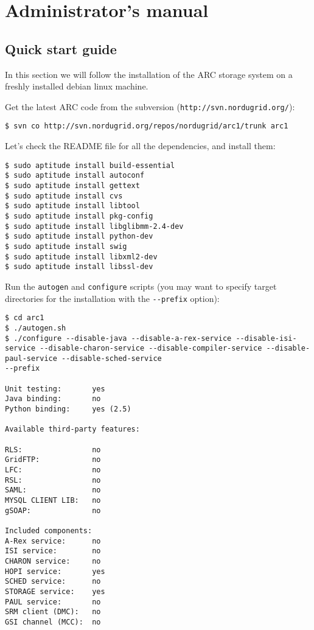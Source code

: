 \documentclass{book}
\begin{document}
\chapter{Administrator's manual} %
\label{cha:administrator_s_manual}

\section{Quick start guide} %
\label{sec:quick_start_guide}

In this section we will follow the installation of the ARC storage system on a freshly installed debian linux machine. 

Get the latest ARC code from the subversion (\verb!http://svn.nordugrid.org/!):

\begin{verbatim}
$ svn co http://svn.nordugrid.org/repos/nordugrid/arc1/trunk arc1
\end{verbatim}

Let's check the README file for all the dependencies, and install them:

\begin{verbatim}
$ sudo aptitude install build-essential
$ sudo aptitude install autoconf
$ sudo aptitude install gettext
$ sudo aptitude install cvs
$ sudo aptitude install libtool
$ sudo aptitude install pkg-config
$ sudo aptitude install libglibmm-2.4-dev
$ sudo aptitude install python-dev
$ sudo aptitude install swig
$ sudo aptitude install libxml2-dev
$ sudo aptitude install libssl-dev
\end{verbatim}

Run the \verb!autogen! and \verb!configure! scripts (you may want to specify target directories for the installation with the \verb!--prefix! option):

\begin{verbatim}
$ cd arc1
$ ./autogen.sh
$ ./configure --disable-java --disable-a-rex-service --disable-isi-service --disable-charon-service --disable-compiler-service --disable-paul-service --disable-sched-service
--prefix

Unit testing:       yes
Java binding:       no
Python binding:     yes (2.5)

Available third-party features:

RLS:                no
GridFTP:            no
LFC:                no
RSL:                no
SAML:               no
MYSQL CLIENT LIB:   no
gSOAP:              no

Included components:
A-Rex service:      no
ISI service:        no
CHARON service:     no
HOPI service:       yes
SCHED service:      no
STORAGE service:    yes
PAUL service:       no
SRM client (DMC):   no
GSI channel (MCC):  no

\end{verbatim}
\end{document}
